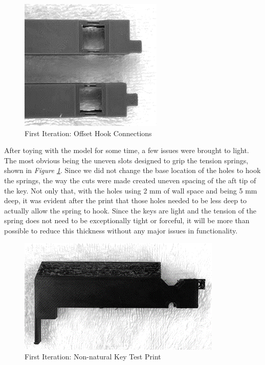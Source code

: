 \begin{figure}[h!]
  \centering
  \includegraphics[width=0.6\linewidth]{image/Print2.png}
  \caption{First Iteration: Offset Hook Connections}
  \label{fig:print2}
\end{figure}

After toying with the model for some time, a few issues were brought to light. The most obvious being the uneven slots designed to grip the tension springs, shown in \textit{Figure \ref{fig:print2}}. Since we did not change the base location of the holes to hook the springs, the way the cuts were made created uneven spacing of the aft tip of the key. Not only that, with the holes using 2 mm of wall space and being 5 mm deep, it was evident after the print that those holes needed to be less deep to actually allow the spring to hook. Since the keys are light and the tension of the spring does not need to be exceptionally tight or forceful, it will be more than possible to reduce this thickness without any major issues in functionality.

\begin{figure}[h!]
  \centering
  \includegraphics[width=0.8\linewidth]{image/Print3.png}
  \caption{First Iteration: Non-natural Key Test Print}
  \label{fig:print3}
\end{figure}

